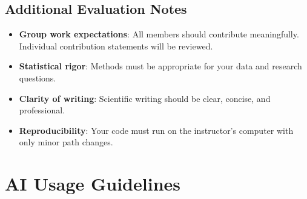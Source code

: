 \documentclass[11pt]{article}
\begin{document}
\subsection*{Additional Evaluation Notes}

\begin{itemize}
\item \textbf{Group work expectations}: All members should contribute meaningfully. Individual contribution statements will be reviewed.
\item \textbf{Statistical rigor}: Methods must be appropriate for your data and research questions.
\item \textbf{Clarity of writing}: Scientific writing should be clear, concise, and professional.
\item \textbf{Reproducibility}: Your code must run on the instructor's computer with only minor path changes.
\end{itemize}

\newpage

\section*{AI Usage Guidelines}
\end{document}
